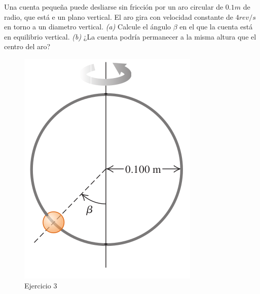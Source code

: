 \begin{mdframed}[style=warning]
	\begin{ejercicio}
		Una cuenta pequeña puede desliarse sin fricción por un aro circular de $0.1m$ de radio, que está e un plano vertical. El aro gira con velocidad constante de $4rev/s$ en torno a un diametro vertical. \textit{(a)} Calcule el ángulo $\beta$ en el que la cuenta está en equilibrio vertical. \textit{(b)} ¿La cuenta podría permanecer a la misma altura que el centro del aro?
		\begin{figure}[H]
			\centering
			\includegraphics[scale=0.35]{./img/5119.png}
			\caption{Ejercicio 3}
			\label{5119}
		\end{figure}
	\end{ejercicio}
\end{mdframed}

















